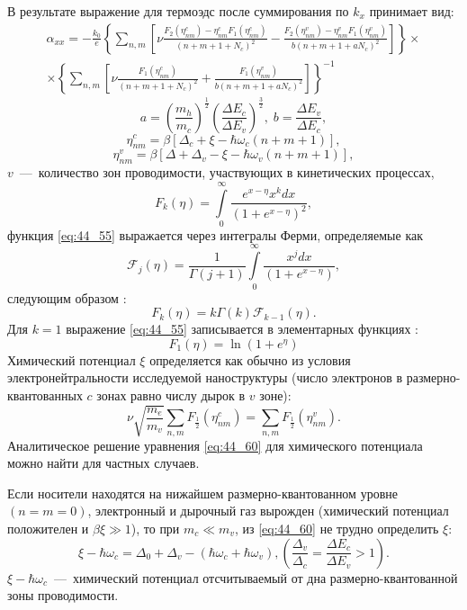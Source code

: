 В результате выражение для термоэдс после суммирования по $k_x $ принимает вид:
 \begin{multline} \label{eq:44_50}
\alpha _{xx} =-\frac{k_0}{e} \left\{\sum_{n,m}\left[\nu \frac{F_2 \left(\eta_{nm}^c \right)-\eta _{nm}^c F_1 \left(\eta_{nm}^c \right)}{\left(n+m+1+N_c \right)^2 } -\frac{F_2 \left(\eta_{nm}^v \right)-\eta_{nm}^v F_1 \left(\eta_{nm}^v \right)}{b\left(n+m+1+aN_c \right)^2 } \right] \right\}\times\\
\times \left\{\sum _{n,m}\left[\nu \frac{F_1 \left(\eta_{nm}^c \right)}{\left(n+m+1+N_c \right)^2 } +\frac{F_1 \left(\eta_{nm}^v \right)}{b\left(n+m+1+a N_c \right)^2 } \right] \right\}^{-1}
\end{multline}
\[
a=\left(\frac{m_h }{m_c } \right)^{\frac{1}{2} } \left(\frac{\Delta E_c }{\Delta E_v } \right)^{\frac{3}{2} } ,\;
b=\frac{\Delta E_v }{\Delta E_c } ,
\] 
\[
\eta_{nm}^c =\beta \left[\Delta_c +\xi -\hbar \omega_c \left(n+m+1\right)\right],
\] 
\[
\eta_{nm}^v =\beta \left[\Delta +\Delta_v -\xi -\hbar \omega_v \left(n+m+1\right)\right],
\]
$v$~---~количество зон проводимости, участвующих в кинетических процессах, 
\begin{equation} \label{eq:44_55}
F_k (\eta )=\int\limits_0^{\infty }{\frac{ e^{x-\eta } x^k dx}{\left(1 + e^{x-\eta }\right)^2 }} ,
\end{equation}
функция \eqref{eq:44_55} выражается через интегралы Ферми, определяемые как \cite{Dingle1957,Blakemore1982}
\[
\mathcal{F}_j (\eta )=\frac{1}{\Gamma(j+1)}\int\limits_0^{\infty }{\frac{x^j dx}{\left(1 + e^{x-\eta }\right) }} ,
\]
следующим образом \cite{Askerov1970}:
\[
F_k (\eta ) =k \Gamma(k) \mathcal{F}_{k-1} (\eta ).
\]
Для $k=1$ выражение \eqref{eq:44_55} записывается в элементарных функциях \cite{Rhodes1950}:
\[
F_1 (\eta )=\ln \left(1 + e^{\eta }\right)
\]
Химический потенциал $\xi $ определяется как обычно из условия электронейтральности исследуемой наноструктуры (число электронов в размерно-квантованных $c$ зонах равно числу дырок в $v$ зоне):
\begin{equation} \label{eq:44_60}
\nu \sqrt{\frac{m_e }{m_v } } \sum_{n,m}F_{\frac{1}{2}}\left(\eta_{nm}^c \right) =\sum_{n,m}F_{ \frac{1}{2}} \left(\eta_{nm}^v \right) .
\end{equation}
Аналитическое решение уравнения \eqref{eq:44_60} для химического потенциала можно найти для частных случаев.
 
Если носители находятся на нижайшем размерно-квантованном уровне $(n=m=0)$, электронный и дырочный газ вырожден (химический потенциал положителен и $\beta \xi \gg 1$), то при $m_c \ll m_v $, из \eqref{eq:44_60} не трудно определить $\xi $:
\[
\xi -\hbar \omega_c =\Delta_0 +\Delta_v -\left(\hbar \omega_c +\hbar \omega_v \right), \left(\frac{\Delta_v }{\Delta_c } =\frac{\Delta E_c }{\Delta E_v } >1\right).
\] 
$\xi -\hbar \omega_c $~---~химический потенциал отсчитываемый от дна размерно-квантованной зоны проводимости.

